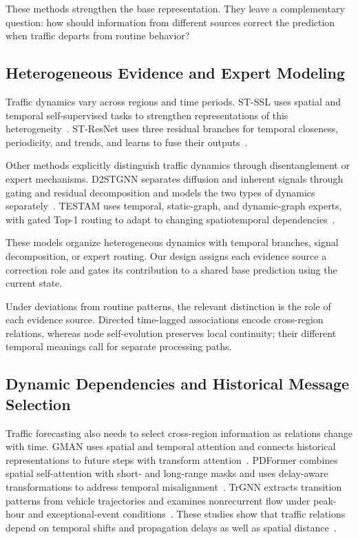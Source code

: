 These methods strengthen the base representation. They leave a complementary question: how should information from different sources correct the prediction when traffic departs from routine behavior?

\subsection{Heterogeneous Evidence and Expert Modeling}\label{sec:experts-related}

Traffic dynamics vary across regions and time periods. ST-SSL uses spatial and temporal self-supervised tasks to strengthen representations of this heterogeneity~\cite{ref30}. ST-ResNet uses three residual branches for temporal closeness, periodicity, and trends, and learns to fuse their outputs~\cite{ref14}.

Other methods explicitly distinguish traffic dynamics through disentanglement or expert mechanisms. D2STGNN separates diffusion and inherent signals through gating and residual decomposition and models the two types of dynamics separately~\cite{ref25}. TESTAM uses temporal, static-graph, and dynamic-graph experts, with gated Top-1 routing to adapt to changing spatiotemporal dependencies~\cite{ref26}.

These models organize heterogeneous dynamics with temporal branches, signal decomposition, or expert routing. Our design assigns each evidence source a correction role and gates its contribution to a shared base prediction using the current state.

Under deviations from routine patterns, the relevant distinction is the role of each evidence source. Directed time-lagged associations encode cross-region relations, whereas node self-evolution preserves local continuity; their different temporal meanings call for separate processing paths.

\subsection{Dynamic Dependencies and Historical Message Selection}\label{sec:messages-related}

Traffic forecasting also needs to select cross-region information as relations change with time. GMAN uses spatial and temporal attention and connects historical representations to future steps with transform attention~\cite{ref05}. PDFormer combines spatial self-attention with short- and long-range masks and uses delay-aware transformations to address temporal misalignment~\cite{ref10}. TrGNN extracts transition patterns from vehicle trajectories and examines nonrecurrent flow under peak-hour and exceptional-event conditions~\cite{ref40}. These studies show that traffic relations depend on temporal shifts and propagation delays as well as spatial distance~\cite{ref10,ref39}.

